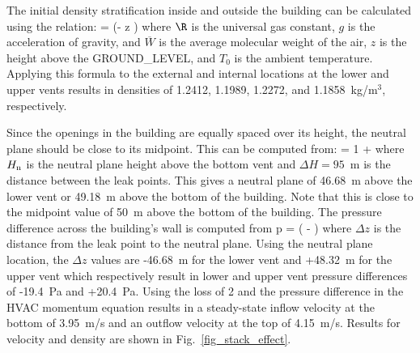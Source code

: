 \documentclass[11pt]{book}
\begin{document}
The initial density stratification inside and outside the building can be calculated using the relation:
\be
    = \exp \left(-  z \right)
\ee
where $\R$ is the universal gas constant, $g$ is the acceleration of gravity, and $\overline{W}$ is the average molecular weight of the air, $z$ is the height above the {\ct GROUND\_LEVEL}, and $T_0$ is the ambient temperature. Applying this formula to the external and internal locations at the lower and upper vents results in densities of 1.2412, 1.1989, 1.2272, and 1.1858~kg/m$^3$, respectively.

Since the openings in the building are equally spaced over its height, the neutral plane should be close to its midpoint. This can be computed from:
\be
    = 1 + 
\ee
where $H_{\rm n}$ is the neutral plane height above the bottom vent and $\Delta H=95$~m is the distance between the leak points.  This gives a neutral plane of 46.68~m above the lower vent or 49.18~m above the bottom of the building.  Note that this is close to the midpoint value of 50~m above the bottom of the building. The pressure difference across the building's wall is computed from
\be
   \Delta p =  \R \left(  -  \right)
\ee
where $ \Delta z$ is the distance from the leak point to the neutral plane.  Using the neutral plane location, the $ \Delta z$ values are -46.68~m for the lower vent and +48.32~m for the upper vent which respectively result in lower and upper vent pressure differences of -19.4~Pa and +20.4~Pa.  Using the loss of 2 and the pressure difference in the HVAC momentum equation results in a steady-state inflow velocity at the bottom of 3.95~m/s and an outflow velocity at the top of 4.15~m/s. Results for velocity and density are shown in Fig.~\ref{fig_stack_effect}.
\end{document}
